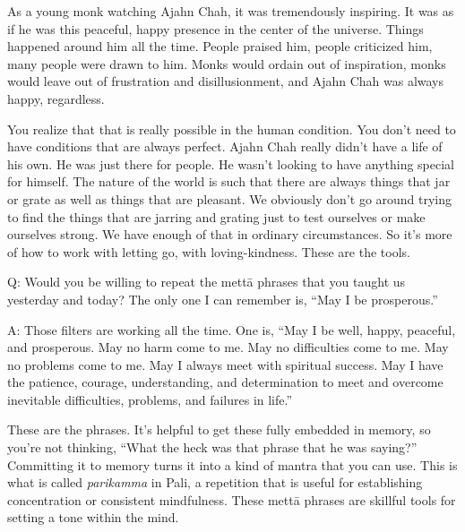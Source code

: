 As a young monk watching Ajahn Chah, it was tremendously inspiring. It
was as if he was this peaceful, happy presence in the center of the
universe. Things happened around him all the time. People praised him,
people criticized him, many people were drawn to him. Monks would ordain
out of inspiration, monks would leave out of frustration and
disillusionment, and Ajahn Chah was always happy, regardless.

You realize that that is really possible in the human condition. You
don’t need to have conditions that are always perfect. Ajahn Chah really
didn’t have a life of his own. He was just there for people. He wasn’t
looking to have anything special for himself. The nature of the world is
such that there are always things that jar or grate as well as things
that are pleasant. We obviously don’t go around trying to find the
things that are jarring and grating just to test ourselves or make
ourselves strong. We have enough of that in ordinary circumstances. So
it’s more of how to work with letting go, with loving-kindness. These
are the tools.

\qaspace
Q: Would you be willing to repeat the mettā phrases that you taught us
yesterday and today? The only one I can remember is, “May I be
prosperous.”

\qaspace
A: Those filters are working all the time. One is, “May I be well,
happy, peaceful, and prosperous. May no harm come to me. May no
difficulties come to me. May no problems come to me. May I always meet
with spiritual success. May I have the patience, courage, understanding,
and determination to meet and overcome inevitable difficulties,
problems, and failures in life.”

These are the phrases. It’s helpful to get these fully embedded in
memory, so you’re not thinking, “What the heck was that phrase that he
was saying?” Committing it to memory turns it into a kind of mantra that
you can use. This is what is called \emph{parikamma} in Pali, a
repetition that is useful for establishing concentration or consistent
mindfulness. These mettā phrases are skillful tools for setting a tone
within the mind.
